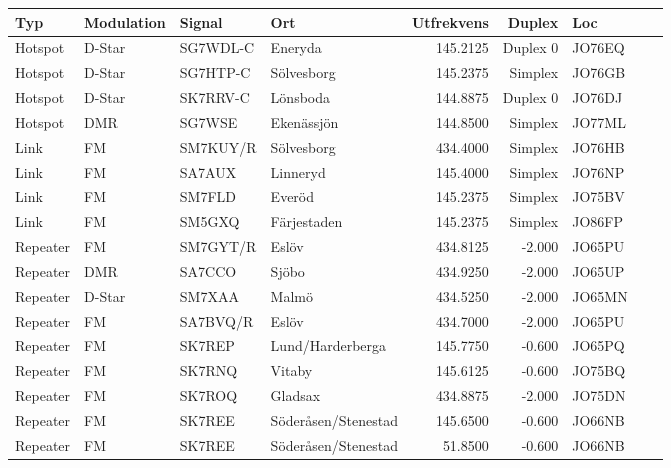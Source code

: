 \begin{longtable}{llllrrlcl}
	Typ      & Modulation      & Signal   & Ort                     & Utfrekvens &   Duplex & Loc    &  &  \\ \hline
	Hotspot  & D-Star          & SG7WDL-C & Eneryda                 &   145.2125 & Duplex 0 & JO76EQ &  &  \\
	Hotspot  & D-Star          & SG7HTP-C & Sölvesborg              &   145.2375 &  Simplex & JO76GB &  &  \\
	Hotspot  & D-Star          & SK7RRV-C & Lönsboda                &   144.8875 & Duplex 0 & JO76DJ &  &  \\
	Hotspot  & DMR             & SG7WSE   & Ekenässjön              &   144.8500 &  Simplex & JO77ML &  &  \\
	Link     & FM              & SM7KUY/R & Sölvesborg              &   434.4000 &  Simplex & JO76HB &  &  \\
	Link     & FM              & SA7AUX   & Linneryd                &   145.4000 &  Simplex & JO76NP &  &  \\
	Link     & FM              & SM7FLD   & Everöd                  &   145.2375 &  Simplex & JO75BV &  &  \\
	Link     & FM              & SM5GXQ   & Färjestaden             &   145.2375 &  Simplex & JO86FP &  &  \\
	Repeater & FM              & SM7GYT/R & Eslöv                   &   434.8125 &   -2.000 & JO65PU &  &  \\
	Repeater & DMR             & SA7CCO   & Sjöbo                   &   434.9250 &   -2.000 & JO65UP &  &  \\
	Repeater & D-Star          & SM7XAA   & Malmö                   &   434.5250 &   -2.000 & JO65MN &  &  \\
	Repeater & FM              & SA7BVQ/R & Eslöv                   &   434.7000 &   -2.000 & JO65PU &  &  \\
	Repeater & FM              & SK7REP   & Lund/Harderberga        &   145.7750 &   -0.600 & JO65PQ &  &  \\
	Repeater & FM              & SK7RNQ   & Vitaby                  &   145.6125 &   -0.600 & JO75BQ &  &  \\
	Repeater & FM              & SK7ROQ   & Gladsax                 &   434.8875 &   -2.000 & JO75DN &  &  \\
	Repeater & FM              & SK7REE   & Söderåsen/Stenestad     &   145.6500 &   -0.600 & JO66NB &  &  \\
	Repeater & FM              & SK7REE   & Söderåsen/Stenestad     &    51.8500 &   -0.600 & JO66NB &  &  \\

\end{longtable}

